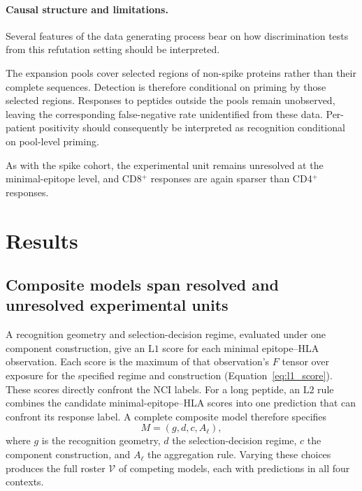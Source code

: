 \documentclass[11pt]{article}
\begin{document}
\paragraph{Causal structure and limitations.}

Several features of the data generating process bear on how discrimination
tests from this refutation setting should be interpreted.

The expansion pools cover selected regions of non-spike proteins rather than
their complete sequences. Detection is therefore conditional on priming by
those selected regions. Responses to peptides outside the pools remain
unobserved, leaving the corresponding false-negative rate unidentified from
these data. Per-patient positivity should consequently be interpreted as
recognition conditional on pool-level priming.

As with the spike cohort, the experimental unit remains unresolved at the
minimal-epitope level, and CD8$^+$ responses are again sparser than CD4$^+$
responses.


\section{Results}
\label{sec:results}

\subsection{Composite models span resolved and unresolved experimental units}

A recognition geometry and selection-decision regime, evaluated under one
component construction, give an \(\mathrm{L1}\) score for each minimal
epitope--HLA observation. Each score is the maximum of that observation's
\(F\) tensor over exposure for the specified regime and construction
(Equation~\eqref{eq:l1_score}). These scores directly confront the NCI labels.
For a long peptide, an \(\mathrm{L2}\) rule combines the candidate
minimal-epitope--HLA scores into one prediction that can confront its response
label. A complete composite model therefore specifies
\begin{equation}
M=(g,d,c,A_{\ell}),
\label{eq:composite_roster}
\end{equation}
where \(g\) is the recognition geometry, \(d\) the selection-decision regime,
\(c\) the component construction, and \(A_{\ell}\) the aggregation rule.
Varying these choices produces the full roster \(\mathcal{V}\) of competing
models, each with predictions in all four contexts.
\end{document}
